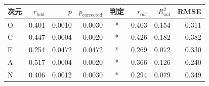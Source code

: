\begin{tabular}{lrrrcrrr}
\toprule
次元 & $r_{\mathrm{fold}}$ & $p$ & $p_{\mathrm{corrected}}$ & 判定 & $r_{\mathrm{oof}}$ & $R^{2}_{\mathrm{oof}}$ & RMSE \\
\midrule
O & 0.401 & 0.0010 & 0.0030 & * & 0.403 & 0.154 & 0.311 \\
C & 0.447 & 0.0004 & 0.0020 & * & 0.426 & 0.182 & 0.382 \\
E & 0.254 & 0.0472 & 0.0472 & * & 0.269 & 0.072 & 0.330 \\
A & 0.517 & 0.0004 & 0.0020 & * & 0.366 & 0.126 & 0.240 \\
N & 0.406 & 0.0012 & 0.0030 & * & 0.294 & 0.079 & 0.349 \\
\bottomrule
\end{tabular}

